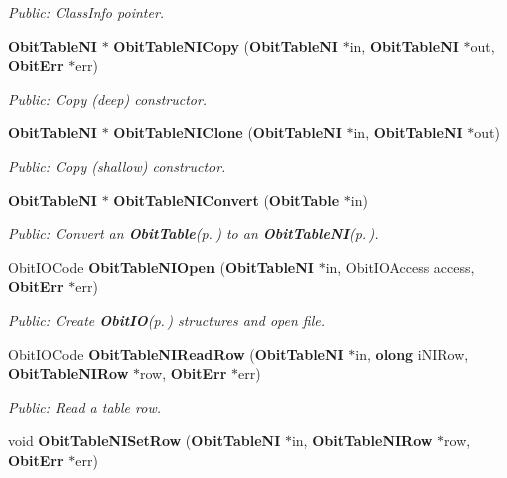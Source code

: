 \begin{CompactItemize}
\begin{CompactList}\small\item\em Public: Class\-Info pointer. \item\end{CompactList}\item 
{\bf Obit\-Table\-NI} $\ast$ {\bf Obit\-Table\-NICopy} ({\bf Obit\-Table\-NI} $\ast$in, {\bf Obit\-Table\-NI} $\ast$out, {\bf Obit\-Err} $\ast$err)
\begin{CompactList}\small\item\em Public: Copy (deep) constructor. \item\end{CompactList}\item 
{\bf Obit\-Table\-NI} $\ast$ {\bf Obit\-Table\-NIClone} ({\bf Obit\-Table\-NI} $\ast$in, {\bf Obit\-Table\-NI} $\ast$out)
\begin{CompactList}\small\item\em Public: Copy (shallow) constructor. \item\end{CompactList}\item 
{\bf Obit\-Table\-NI} $\ast$ {\bf Obit\-Table\-NIConvert} ({\bf Obit\-Table} $\ast$in)
\begin{CompactList}\small\item\em Public: Convert an {\bf Obit\-Table}{\rm (p.\,\pageref{structObitTable})} to an {\bf Obit\-Table\-NI}{\rm (p.\,\pageref{structObitTableNI})}. \item\end{CompactList}\item 
Obit\-IOCode {\bf Obit\-Table\-NIOpen} ({\bf Obit\-Table\-NI} $\ast$in, Obit\-IOAccess access, {\bf Obit\-Err} $\ast$err)
\begin{CompactList}\small\item\em Public: Create {\bf Obit\-IO}{\rm (p.\,\pageref{structObitIO})} structures and open file. \item\end{CompactList}\item 
Obit\-IOCode {\bf Obit\-Table\-NIRead\-Row} ({\bf Obit\-Table\-NI} $\ast$in, {\bf olong} i\-NIRow, {\bf Obit\-Table\-NIRow} $\ast$row, {\bf Obit\-Err} $\ast$err)
\begin{CompactList}\small\item\em Public: Read a table row. \item\end{CompactList}\item 
void {\bf Obit\-Table\-NISet\-Row} ({\bf Obit\-Table\-NI} $\ast$in, {\bf Obit\-Table\-NIRow} $\ast$row, {\bf Obit\-Err} $\ast$err)

\end{CompactItemize}
